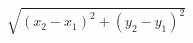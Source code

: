 \documentclass{article}
\begin{document}
$\sqrt{(x_2 - x_1)^2 + (y_2 - y_1)^2}$
\pagebreak
\end{document}
